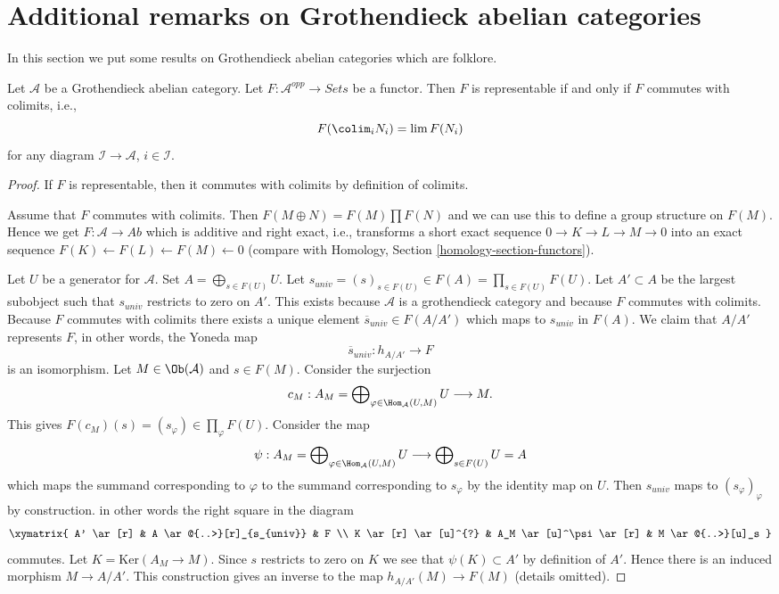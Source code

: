 \section{Additional remarks on Grothendieck abelian categories}
\label{section-additional-Grothendieck}

\noindent
In this section we put some results on Grothendieck abelian categories
which are folklore.

\begin{lemma}
\label{lemma-grothendieck-brown}
Let $\mathcal{A}$ be a Grothendieck abelian category.
Let $F : \mathcal{A}^{opp} \to \textit{Sets}$ be a functor.
Then $F$ is representable if and only if $F$ commutes with colimits, i.e.,
$$
F(\colim_i N_i) = \lim F(N_i)
$$
for any diagram $\mathcal{I} \to \mathcal{A}$, $i \in \mathcal{I}$.
\end{lemma}

\begin{proof}
If $F$ is representable, then it commutes with colimits by definition
of colimits.

\medskip\noindent
Assume that $F$ commutes with colimits. Then $F(M \oplus N) = F(M) \prod F(N)$
and we can use this to define a group structure on $F(M)$. Hence we get
$F : \mathcal{A} \to \textit{Ab}$ which is additive and right exact, i.e.,
transforms a short exact sequence $0 \to K \to L \to M \to 0$ into an exact
sequence $F(K) \leftarrow F(L) \leftarrow F(M) \leftarrow 0$ (compare with
Homology, Section \ref{homology-section-functors}).

\medskip\noindent
Let $U$ be a generator for $\mathcal{A}$. Set $A = \bigoplus_{s \in F(U)} U$.
Let $s_{univ} = (s)_{s \in F(U)} \in F(A) = \prod_{s \in F(U)} F(U)$. Let
$A' \subset A$ be the largest subobject such that $s_{univ}$ restricts to
zero on $A'$. This exists because $\mathcal{A}$ is a grothendieck category
and because $F$ commutes with colimits. Because $F$ commutes with colimits
there exists a unique element $\overline{s}_{univ} \in F(A/A')$ which
maps to $s_{univ}$ in $F(A)$. We claim that $A/A'$ represents $F$, in
other words, the Yoneda map
$$
\overline{s}_{univ} : h_{A/A'} \longrightarrow F
$$
is an isomorphism. Let $M \in \Ob(\mathcal{A})$ and $s \in F(M)$. Consider
the surjection
$$
c_M :
A_M = \bigoplus\nolimits_{\varphi \in \Hom_\mathcal{A}(U, M)} U
\longrightarrow
M.
$$
This gives $F(c_M)(s) = (s_\varphi) \in \prod_\varphi F(U)$.
Consider the map
$$
\psi :
A_M = \bigoplus\nolimits_{\varphi \in \Hom_\mathcal{A}(U, M)} U
\longrightarrow
\bigoplus\nolimits_{s \in F(U)} U = A
$$
which maps the summand corresponding to $\varphi$ to the summand
corresponding to $s_\varphi$ by the identity map on $U$. Then $s_{univ}$
maps to $(s_\varphi)_\varphi$ by construction.
in other words the right square in the diagram
$$
\xymatrix{
A' \ar[r] &
A \ar@{..>}[r]_{s_{univ}} & F \\
K \ar[r] \ar[u]^{?} & A_M \ar[u]^\psi \ar[r] &
M \ar@{..>}[u]_s
}
$$
commutes. Let $K = \text{Ker}(A_M \to M)$. Since $s$ restricts to zero
on $K$ we see that $\psi(K) \subset A'$ by definition of $A'$. Hence there
is an induced morphism $M \to A/A'$. This construction gives an inverse
to the map $h_{A/A'}(M) \to F(M)$ (details omitted).
\end{proof}

